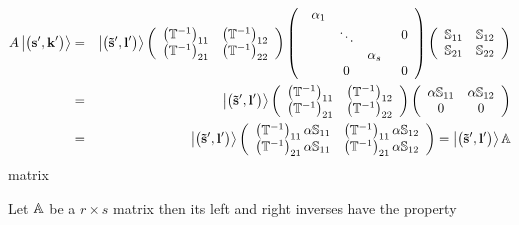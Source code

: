 \begin{eqnarray}
A\left| \left( {\bf s}^{\prime }{\bf ,k}^{\prime }\right) \right\rangle
&=&\left| \left( {\bf \tilde{s}}^{\prime }{\bf ,l}^{\prime }\right)
\right\rangle \left( 
\begin{array}{cc}
\left( {\Bbb T}^{-1}\right) _{11} & \left( {\Bbb T}^{-1}\right) _{12} \\ 
\left( {\Bbb T}^{-1}\right) _{21} & \left( {\Bbb T}^{-1}\right) _{22}%
\end{array}%
\right) \left( 
\begin{array}{cc}
\begin{array}{ccc}
\alpha _{1} &  &  \\ 
& \ddots &  \\ 
&  & \alpha _{s}%
\end{array}
& 0 \\ 
0 & 0%
\end{array}%
\right) \left( 
\begin{array}{cc}
{\Bbb S}_{11} & {\Bbb S}_{12} \\ 
{\Bbb S}_{21} & {\Bbb S}_{22}%
\end{array}%
\right)  \nonumber \\
&=&\left| \left( {\bf \tilde{s}}^{\prime }{\bf ,l}^{\prime }\right)
\right\rangle \left( 
\begin{array}{cc}
\left( {\Bbb T}^{-1}\right) _{11} & \left( {\Bbb T}^{-1}\right) _{12} \\ 
\left( {\Bbb T}^{-1}\right) _{21} & \left( {\Bbb T}^{-1}\right) _{22}%
\end{array}%
\right) \left( 
\begin{array}{cc}
\alpha {\Bbb S}_{11} & \alpha {\Bbb S}_{12} \\ 
0 & 0%
\end{array}%
\right)  \nonumber \\
&=&\left| \left( {\bf \tilde{s}}^{\prime }{\bf ,l}^{\prime }\right)
\right\rangle \left( 
\begin{array}{cc}
\left( {\Bbb T}^{-1}\right) _{11}\alpha {\Bbb S}_{11} & \left( {\Bbb T}%
^{-1}\right) _{11}\alpha {\Bbb S}_{12} \\ 
\left( {\Bbb T}^{-1}\right) _{21}\alpha {\Bbb S}_{11} & \left( {\Bbb T}%
^{-1}\right) _{21}\alpha {\Bbb S}_{12}%
\end{array}%
\right) =\left| \left( {\bf \tilde{s}}^{\prime }{\bf ,l}^{\prime }\right)
\right\rangle {\Bbb A}
\end{eqnarray}%
matrix

Let ${\Bbb A}$ be a $r\times s$ matrix then its left and right inverses have
the property

